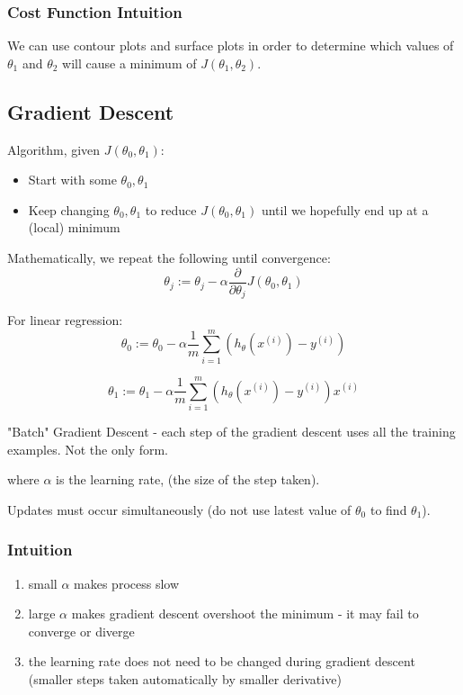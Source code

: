 \documentclass[11pt,letterpaper]{article}
\begin{document}
\subsubsection{Cost Function Intuition}
We can use contour plots and surface plots in order to determine which values of \(\theta_1\) and \(\theta_2\) will cause a minimum of \(J(\theta_1, \theta_2)\).

\subsection{Gradient Descent}
Algorithm, given $J(\theta_0, \theta_1)$:
\begin{itemize}
	\item Start with some $\theta_0, \theta_1$
	\item Keep changing  $\theta_0, \theta_1$ to reduce $J(\theta_0, \theta_1)$ until we hopefully end up at a (local) minimum
\end{itemize}
Mathematically, we repeat the following until convergence:
	$$\theta_j := \theta_j - \alpha \frac{\partial}{\partial \theta_j} J(\theta_0, \theta_1)$$

For linear regression:
$$ \theta_0 := \theta_0 - \alpha \frac{1}{m}\sum_{i=1}^{m}(h_\theta( x^{(i)})-y^{(i)}) $$

$$ \theta_1 := \theta_1 - \alpha \frac{1}{m}\sum_{i=1}^{m}(h_\theta( x^{(i)})-y^{(i)}) x^{(i)}$$

"Batch" Gradient Descent - each step of the gradient descent uses all the training examples. Not the only form.

where $\alpha$ is the learning rate, (the size of the step taken).

Updates must occur simultaneously (do not use latest value of $\theta_0$ to find $\theta_1$).

\subsubsection{Intuition}
\begin{enumerate}
	\item small \(\alpha\) makes process slow 
	\item large \(\alpha\) makes gradient descent overshoot the minimum - it may fail to converge or diverge
	\item the learning rate does not need to be changed during gradient descent (smaller steps taken automatically by smaller derivative)
\end{enumerate}
\end{document}
